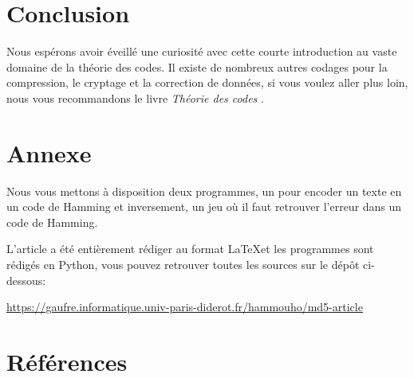 \documentclass[a4paper, 12pt]{article}
\begin{document}
	\section{Conclusion}
		Nous espérons avoir éveillé une curiosité avec cette courte introduction au vaste domaine	de la
		théorie des codes. Il existe de nombreux autres codages pour la compression, le cryptage et la
		correction de données, si vous voulez aller plus loin, nous vous recommandons le livre \textit{Théorie
		des codes} \cite{TheorieDesCodes}.

	\appendix %
	\section{Annexe}
		Nous vous mettons à disposition deux programmes, un pour encoder un texte
		en un code de Hamming et inversement, un jeu où il faut retrouver l'erreur
		dans un code de Hamming.

		L'article a été entièrement rédiger au format \LaTeX et les programmes sont
		rédigés en Python, vous pouvez retrouver toutes les sources sur le dépôt ci-dessous:

		\href{https://gaufre.informatique.univ-paris-diderot.fr/hammouho/md5-article}{https://gaufre.informatique.univ-paris-diderot.fr/hammouho/md5-article}

	\section{Références}
	\begingroup
	\nocite{*}
	
	\renewcommand{\section}[2]{}
	
	\endgroup
\end{document}
